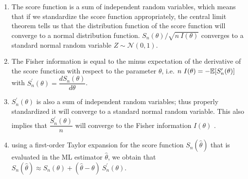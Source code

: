 \begin{enumerate}
    \item The score function is a sum of independent random variables, which means that if we standardize the score function appropriately, the central limit theorem tells us that the distribution function of the score function will converge to a normal distribution function.
    $S_n (\theta)/\sqrt{n\ I (\theta)}$ converges to a standard normal random variable $Z \sim \mathcal{N} (0, 1)$.
    \hfill \cite{statistics/book/Statistics-for-Data-Scientists/Maurits-Kaptein}

    \item The Fisher information is equal to the minus expectation of the derivative of the score function with respect to the parameter $\theta$, i.e. $n\ I (\theta) = -\mathbb{E}[S^\prime_n (\theta)]$ with $S^\prime_n (\theta) = \dfrac{dS_n (\theta)}{d\theta}$.
    \hfill \cite{statistics/book/Statistics-for-Data-Scientists/Maurits-Kaptein}

    \item $S^\prime_n (\theta)$ is also a sum of independent random variables; thus properly standardized it will converge to a standard normal random variable. 
    This also implies that $\dfrac{S^\prime _n (\theta)}{n}$ will converge to the Fisher information $I (\theta)$ .
    \hfill \cite{statistics/book/Statistics-for-Data-Scientists/Maurits-Kaptein}

    \item using a first-order Taylor expansion for the score function $S_n ( \hat{\theta})$ that is evaluated in the ML estimator $\hat{\theta}$, we obtain that $S_n ( \hat{\theta}) \approx S_n (\theta) + ( \hat{\theta} - \theta)\ S^\prime_n (\theta)$.
    \hfill \cite{statistics/book/Statistics-for-Data-Scientists/Maurits-Kaptein}
\end{enumerate}







































